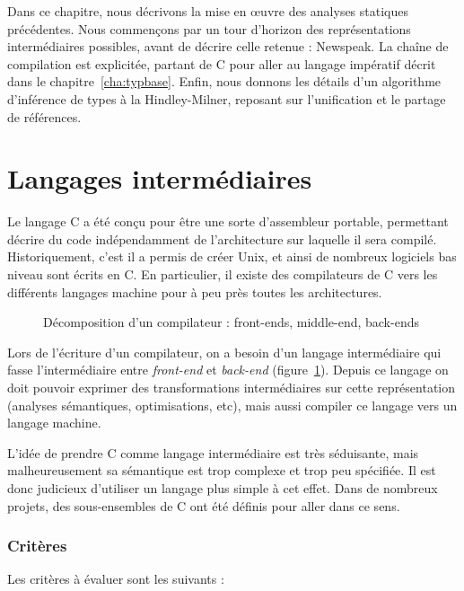 Dans ce chapitre, nous décrivons la mise en œuvre des analyses statiques
précédentes. Nous commençons par un tour d'horizon des représentations
intermédiaires possibles, avant de décrire celle retenue : Newspeak. La chaîne
de compilation est explicitée, partant de C pour aller au langage impératif
décrit dans le chapitre~\ref{cha:typbase}. Enfin, nous donnons les détails d'un
algorithme d'inférence de types à la Hindley-Milner, reposant sur l'unification
et le partage de références.

\section{Langages intermédiaires}

Le langage C \cite{KandR,AnsiC} a été conçu pour être une sorte d'assembleur
portable, permettant décrire du code indépendamment de l'architecture sur
laquelle il sera compilé. Historiquement, c'est il a permis de créer Unix, et
ainsi de nombreux logiciels bas niveau sont écrits en C. En particulier, il
existe des compilateurs de C vers les différents langages machine pour à peu
près toutes les architectures.

\begin{figure}
  \centering

  

  \caption{Décomposition d'un compilateur : front-ends, middle-end, back-ends}
  \label{fig:middle-end}
\end{figure}

Lors de l'écriture d'un compilateur, on a besoin d'un langage intermédiaire qui
fasse l'intermédiaire entre \emph{front-end} et \emph{back-end}
(figure~\ref{fig:middle-end}). Depuis ce langage on doit pouvoir exprimer des
transformations intermédiaires sur cette représentation (analyses sémantiques,
optimisations, etc), mais aussi compiler ce langage vers un langage machine.

L'idée de prendre C comme langage intermédiaire est très séduisante, mais
malheureusement sa sémantique est trop complexe et trop peu spécifiée. Il est
donc judicieux d'utiliser un langage plus simple à cet effet. Dans de nombreux
projets, des sous-ensembles de C ont été définis pour aller dans ce sens.

\subsubsection{Critères}

Les critères à évaluer sont les suivants :

